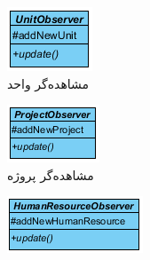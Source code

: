 \begin{figure}[H]
	\centering
	\begin{subfigure}[b]{0.2\textwidth}
		\includegraphics[width=\textwidth]{img/class-design/ui/UnitObserver}
		\caption{مشاهده‌گر واحد}
	\end{subfigure}
	\begin{subfigure}[b]{0.2\textwidth}
		\includegraphics[width=\textwidth]{img/class-design/ui/ProjectObserver}
		\caption{مشاهده‌گر پروژه}
	\end{subfigure}
	\begin{subfigure}[b]{0.2\textwidth}
		\includegraphics[width=\textwidth]{img/class-design/ui/HumanResourceObserver}

\end{subfigure}
\end{figure}
